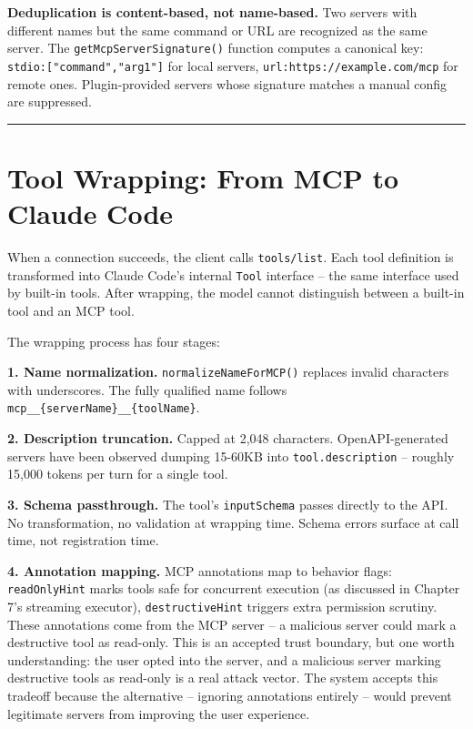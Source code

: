 \documentclass[
  english,
  11pt,
  letterpaper,
]{book}
\begin{document}
\textbf{Deduplication is content-based, not name-based.} Two servers
with different names but the same command or URL are recognized as the
same server. The \texttt{getMcpServerSignature()} function computes a
canonical key: \texttt{stdio:{[}"command","arg1"{]}} for local servers,
\texttt{url:https://example.com/mcp} for remote ones. Plugin-provided
servers whose signature matches a manual config are suppressed.

\begin{center}\rule{0.5\linewidth}{0.5pt}\end{center}

\section{Tool Wrapping: From MCP to Claude
Code}\label{tool-wrapping-from-mcp-to-claude-code}

When a connection succeeds, the client calls \texttt{tools/list}. Each
tool definition is transformed into Claude Code's internal \texttt{Tool}
interface -- the same interface used by built-in tools. After wrapping,
the model cannot distinguish between a built-in tool and an MCP tool.

The wrapping process has four stages:

\textbf{1. Name normalization.} \texttt{normalizeNameForMCP()} replaces
invalid characters with underscores. The fully qualified name follows
\texttt{mcp\_\_\{serverName\}\_\_\{toolName\}}.

\textbf{2. Description truncation.} Capped at 2,048 characters.
OpenAPI-generated servers have been observed dumping 15-60KB into
\texttt{tool.description} -- roughly 15,000 tokens per turn for a single
tool.

\textbf{3. Schema passthrough.} The tool's \texttt{inputSchema} passes
directly to the API. No transformation, no validation at wrapping time.
Schema errors surface at call time, not registration time.

\textbf{4. Annotation mapping.} MCP annotations map to behavior flags:
\texttt{readOnlyHint} marks tools safe for concurrent execution (as
discussed in Chapter 7's streaming executor), \texttt{destructiveHint}
triggers extra permission scrutiny. These annotations come from the MCP
server -- a malicious server could mark a destructive tool as read-only.
This is an accepted trust boundary, but one worth understanding: the
user opted into the server, and a malicious server marking destructive
tools as read-only is a real attack vector. The system accepts this
tradeoff because the alternative -- ignoring annotations entirely --
would prevent legitimate servers from improving the user experience.
\end{document}
